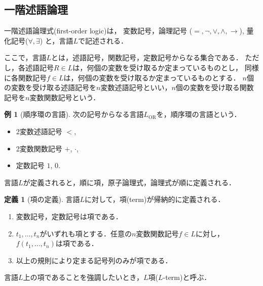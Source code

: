 \documentclass[uplatex, dvipdfmx]{jsarticle}
\theoremstyle{definition}
\newtheorem{definition}{定義}[section]
\newtheorem{example}{例}[section]
\begin{document}
\subsection{一階述語論理}
一階述語論理式(first-order logic)は，
変数記号，論理記号 ($=, \lnot, \lor, \land, \rightarrow$), 量化記号($\forall, \exists$)
と，言語$L$で記述される．
 
ここで，言語$L$とは，述語記号，関数記号，定数記号からなる集合である．
ただし，各述語記号$R \in L$は，何個の変数を受け取るか定まっているものとし，
同様に各関数記号$f \in L$は，何個の変数を受け取るか定まっているものとする．
$n$個の変数を受け取る述語記号を$n$変数述語記号といい，$n$個の変数を受け取る関数記号を$n$変数関数記号という．

\begin{example}[順序環の言語]
     次の記号からなる言語$L_\mathrm{OR}$を，順序環の言語という．
     \begin{itemize}
          \item 2変数述語記号 $<$,
          \item 2変数関数記号 $+$, $\cdot$,
          \item 定数記号 $1$, $0$.
     \end{itemize}
\end{example}

言語$L$が定義されると，順に項，原子論理式，論理式が順に定義される．

\begin{definition}[項の定義]
     言語$L$に対して，項(term)が帰納的に定義される．
     \begin{enumerate}
          \item 変数記号，定数記号は項である．
          \item $t_1, \dots, t_n$がいずれも項とする．任意の$n$変数関数記号$f \in L$に対し，$f(t_1, \dots, t_n)$は項である．
          \item 以上の規則により定まる記号列のみが項である．
     \end{enumerate}
     言語$L$上の項であることを強調したいとき，$L$項($L$-term)と呼ぶ．
\end{definition}
\end{document}
